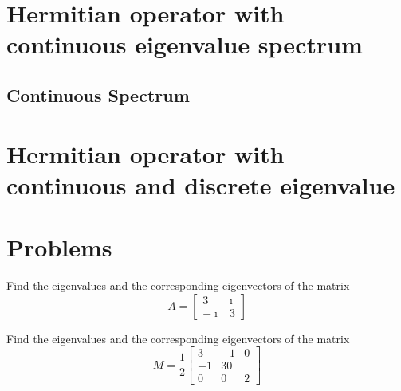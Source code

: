 	\section{Hermitian operator with continuous eigenvalue spectrum}
		\subsection{Continuous Spectrum}
		
	\section{Hermitian operator with continuous and discrete eigenvalue}
	
	\section{Problems}
	
	Find the eigenvalues and the corresponding eigenvectors of the matrix
	\begin{equation}
		A = \left[
		\begin{matrix}
			3 & \imath \\-\imath & 3
		\end{matrix}
		\right]
	\end{equation}



	Find the eigenvalues and the corresponding eigenvectors of the matrix
	\begin{equation}
	M = \frac{1}{2}\left[
	\begin{matrix}
	3 & -1 & 0 \\
	-1 & 3 0 \\
	0 & 0 & 2
	\end{matrix}
	\right]
	\end{equation}

		
